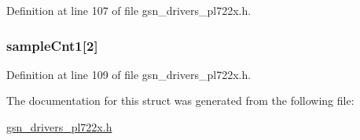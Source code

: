 Definition at line 107 of file gsn\_\-drivers\_\-pl722x.h.

\hypertarget{a00452_a21b9a903ac28ed8f684af16275f0cfdb}{
\subsubsection[{sampleCnt1}]{ {\bf sampleCnt1}\mbox{[}2\mbox{]}}}
\label{a00452_a21b9a903ac28ed8f684af16275f0cfdb}


Definition at line 109 of file gsn\_\-drivers\_\-pl722x.h.



The documentation for this struct was generated from the following file:\begin{DoxyCompactItemize}
\item 
\hyperlink{a00486}{gsn\_\-drivers\_\-pl722x.h}\end{DoxyCompactItemize}
